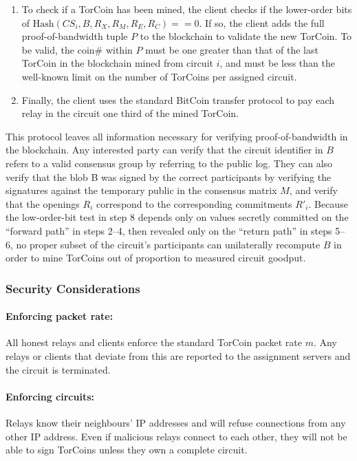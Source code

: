 \begin{enumerate}
\item
To check if a TorCoin has been mined, the client checks if the lower-order
bits of $\textrm{Hash}(CS_i, B, R_X, R_M, R_E, R_C) == 0$.
If so, the client adds the full proof-of-bandwidth tuple $P$
to the blockchain to validate the new TorCoin.
To be valid,
the coin\# within $P$ must be one greater than that
of the last TorCoin in the blockchain mined from circuit $i$,
and must be less than the well-known limit on the number of TorCoins
per assigned circuit.

\item
Finally, the client uses the standard BitCoin transfer protocol
to pay each relay in the circuit one third of the mined TorCoin. 
\end{enumerate}

This protocol leaves all information necessary
for verifying proof-of-bandwidth in the blockchain.
Any interested party can verify that the circuit identifier in $B$
refers to a valid consensus group by referring to the public log.
They can also verify that the blob B was signed
by the correct participants by verifying the signatures
against the temporary public in the consensus matrix $M$,
and verify that the openings $R_i$ correspond to
the corresponding commitments $R'_i$. 
Because the low-order-bit test in step 8 depends only on values
secretly committed on the ``forward path'' in steps 2--4,
then revealed only on the ``return path'' in steps 5--6,
no proper subset of the circuit's participants can unilaterally recompute $B$
in order to mine TorCoins out of proportion to measured circuit goodput.

\subsubsection{Security Considerations}

\paragraph{Enforcing packet rate:} All honest relays and clients enforce the standard
TorCoin packet rate $m$. Any relays or clients that deviate from this are
reported to the assignment servers and the circuit is terminated.

\paragraph{Enforcing circuits:} Relays know their neighbours'
IP addresses and will refuse connections from any other IP address. Even if
malicious relays connect to each other, they will not be able to sign
TorCoins unless they own a complete circuit.

